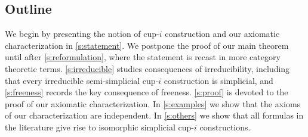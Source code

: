
\subsection*{Outline}

We begin by presenting the notion of \mbox{cup-$i$} construction and our axiomatic characterization in \cref{s:statement}.
We postpone the proof of our main theorem until after \cref{s:reformulation}, where the statement is recast in more category theoretic terms.
\cref{s:irreducible} studies consequences of irreducibility, including that every irreducible semi-simplicial \mbox{cup-$i$} construction is simplicial, and \cref{s:freeness} records the key consequence of freeness.
\cref{s:proof} is devoted to the proof of our axiomatic characterization.
In \cref{s:examples} we show that the axioms of our characterization are independent.
In \cref{s:others} we show that all formulas in the literature give rise to isomorphic simplicial \mbox{cup-$i$} constructions.
